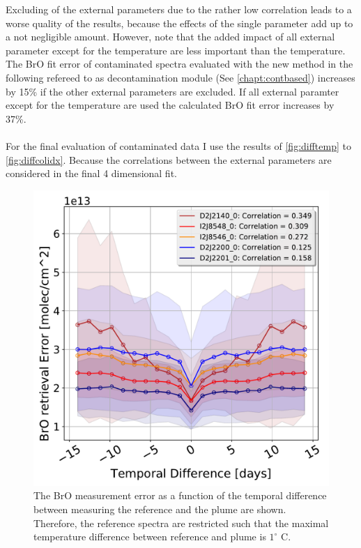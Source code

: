 \documentclass  [
  paper    = a4,
  BCOR     = 10mm,
  twoside,
  fontsize = 12pt,
  fleqn,
  toc      = bibnumbered,
  toc      = listofnumbered,
  numbers  = noendperiod,
  headings = normal,
  listof   = leveldown,
  version  = 3.03
]                                       {scrreprt}
\begin{document}
	Excluding of the external parameters due to the rather low correlation leads to a worse quality of the results, because the effects of the single parameter add up to a not negligible amount. However, note that  the added impact of all external parameter except for the temperature are less important than the temperature.
	The BrO fit error of contaminated spectra evaluated with the new method in the following refereed to as decontamination module (See \cref{chapt:contbased}) increases by 15\% if the other external parameters are excluded. If all external paramter except for the temperature are used the calculated BrO fit error increases by 37\%.\\
	\\
	For the final evaluation of contaminated data I use the results of \cref{fig:difftemp} to \cref{fig:diffcolidx}. Because the correlations between the external parameters are considered in the final 4 dimensional fit.\\
	\begin{figure}[h]
		\centering
		\includegraphics[width=0.5\linewidth]{Bilder/BrOErr_OhnEVar/DatwithoutOtherparamallInstruments}
		\caption{The BrO measurement error as a function of the temporal difference between measuring the reference and the plume are shown. Therefore, the reference spectra are restricted such that the maximal temperature difference between reference and plume is $1^\circ$ C.}
		\label{fig:datwithoutotherparamallinstruments}
	\end{figure}
\end{document}
